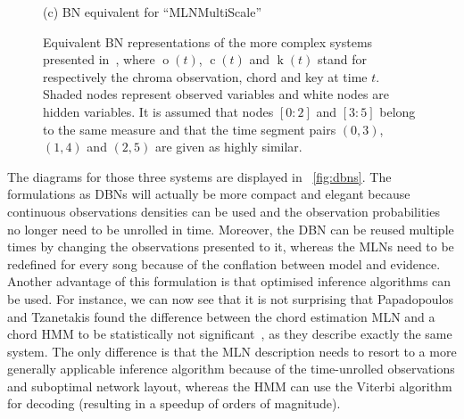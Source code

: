 \documentclass[letterpaper]{article} %
\newcommand{\figref}[1]{\figurename~\ref{fig:#1}} %
\begin{document}
\begin{figure}[htb!]
\begin{minipage}[b]{\linewidth}
\begin{tikzpicture}[align=center]
\end{tikzpicture}
\centerline{(c) BN equivalent for ``MLNMultiScale''}\medskip
\end{minipage}

\caption{Equivalent BN representations of the more complex systems presented in~\cite{papadopoulos2017taslp}, where $\operatorname{o}\left(t\right)$, $\operatorname{c}\left(t\right)$ and $\operatorname{k}\left(t\right)$ stand for respectively the chroma observation, chord and key at time $t$. Shaded nodes represent observed variables and white nodes are hidden variables. It is assumed that nodes $[0:2]$ and $[3:5]$ belong to the same measure and that the time segment pairs $\left(0,3\right)$,$\left(1,4\right)$ and $\left(2,5\right)$ are given as highly similar.}
\label{fig:bn}
\end{figure}

The diagrams for those three systems are displayed in \figref{dbns}. The formulations as DBNs will actually be more compact and elegant because continuous observations densities can be used and the observation probabilities no longer need to be unrolled in time. Moreover, the DBN can be reused multiple times by changing the observations presented to it, whereas the MLNs need to be redefined for every song because of the conflation between model and evidence. Another advantage of this formulation is that optimised inference algorithms can be used. For instance, we can now see that it is not surprising that Papadopoulos and Tzanetakis found the difference between the chord estimation MLN and a chord HMM to be statistically not significant~\cite{papadopoulos2012ismir}, as they describe exactly the same system. The only difference is that the MLN description needs to resort to a more generally applicable inference algorithm because of the time-unrolled observations and suboptimal network layout, whereas the HMM can use the Viterbi algorithm for decoding (resulting in a speedup of orders of magnitude).
\end{document}
